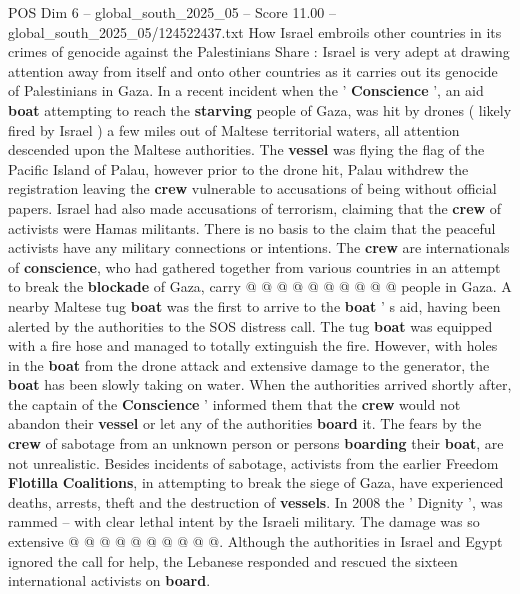 \begin{textsample}{POS Dim 6 – global\_south\_2025\_05 – Score 11.00 – global\_south\_2025\_05/124522437.txt}  \label{ex:f6_pos_034}
How Israel embroils other countries in its crimes of genocide against the Palestinians Share : Israel is very adept at drawing attention away from itself and onto other countries as it carries out its genocide of Palestinians in Gaza.
In a recent incident when the ' \textbf{Conscience} ', an aid \textbf{boat} attempting to reach the \textbf{starving} people of Gaza, was hit by drones ( likely fired by Israel ) a few miles out of Maltese territorial waters, all attention descended upon the Maltese authorities.
The \textbf{vessel} was flying the flag of the Pacific Island of Palau, however prior to the drone hit, Palau withdrew the registration leaving the \textbf{crew} vulnerable to accusations of being without official papers.
Israel had also made accusations of terrorism, claiming that the \textbf{crew} of activists were Hamas militants.
There is no basis to the claim that the peaceful activists have any military connections or intentions.
The \textbf{crew} are internationals of \textbf{conscience}, who had gathered together from various countries in an attempt to break the \textbf{blockade} of Gaza, carry @ @ @ @ @ @ @ @ @ @ people in Gaza.
A nearby Maltese tug \textbf{boat} was the first to arrive to the \textbf{boat} ' s aid, having been alerted by the authorities to the SOS distress call.
The tug \textbf{boat} was equipped with a fire hose and managed to totally extinguish the fire.
However, with holes in the \textbf{boat} from the drone attack and extensive damage to the generator, the \textbf{boat} has been slowly taking on water.
When the authorities arrived shortly after, the captain of the \textbf{Conscience} ' informed them that the \textbf{crew} would not abandon their \textbf{vessel} or let any of the authorities \textbf{board} it.
The fears by the \textbf{crew} of sabotage from an unknown person or persons \textbf{boarding} their \textbf{boat}, are not unrealistic.
Besides incidents of sabotage, activists from the earlier Freedom \textbf{Flotilla} \textbf{Coalitions}, in attempting to break the siege of Gaza, have experienced deaths, arrests, theft and the destruction of \textbf{vessels}.
In 2008 the ' Dignity ', was rammed -- with clear lethal intent by the Israeli military.
The damage was so extensive @ @ @ @ @ @ @ @ @ @.
Although the authorities in Israel and Egypt ignored the call for help, the Lebanese responded and rescued the sixteen international activists on \textbf{board}.

\end{textsample}
